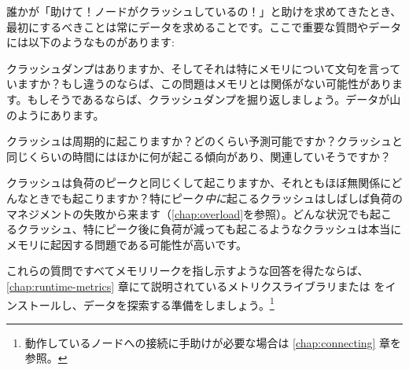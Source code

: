 誰かが「助けて！ノードがクラッシュしているの！」と助けを求めてきたとき、最初にするべきことは常にデータを求めることです。ここで重要な質問やデータには以下のようなものがあります:

\begin{itemize*}
	\item クラッシュダンプはありますか、そしてそれは特にメモリについて文句を言っていますか？もし違うのならば、この問題はメモリとは関係がない可能性があります。もしそうであるならば、クラッシュダンプを掘り返しましょう。データが山のようにあります。
	\item クラッシュは周期的に起こりますか？どのくらい予測可能ですか？クラッシュと同じくらいの時間にはほかに何が起こる傾向があり、関連していそうですか？
	\item クラッシュは負荷のピークと同じくして起こりますか、それともほぼ無関係にどんなときでも起こりますか？特にピーク\emph{中に}起こるクラッシュはしばしば負荷のマネジメントの失敗から来ます（\ref{chap:overload}を参照）。どんな状況でも起こるクラッシュ、特にピーク後に負荷が減っても起こるようなクラッシュは本当にメモリに起因する問題である可能性が高いです。
\end{itemize*}

これらの質問ですべてメモリリークを指し示すような回答を得たならば、\ref{chap:runtime-metrics} 章にて説明されているメトリクスライブラリまたは  をインストールし、データを探索する準備をしましょう。\footnote{動作しているノードへの接続に手助けが必要な場合は \ref{chap:connecting} 章を参照。}

